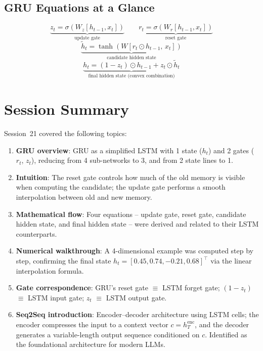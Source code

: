 \documentclass[12pt,a4paper]{article}
\begin{document}
\subsection{GRU Equations at a Glance}

\begin{equation}
  \underbrace{z_t = \sigma(W_z[h_{t-1}, x_t])}_{\text{update gate}}
  \qquad
  \underbrace{r_t = \sigma(W_r[h_{t-1}, x_t])}_{\text{reset gate}}
\end{equation}
\begin{equation}
  \underbrace{\tilde{h}_t = \tanh(W[r_t\odot h_{t-1},\, x_t])}_{\text{candidate hidden state}}
\end{equation}
\begin{equation}
  \underbrace{h_t = (1-z_t)\odot h_{t-1} + z_t\odot\tilde{h}_t}_{\text{final hidden state (convex combination)}}
\end{equation}

\section{Session Summary}
\label{sec:summary}

Session~21 covered the following topics:

\begin{enumerate}[label=\S\arabic*.]
  \item \textbf{GRU overview}: GRU as a simplified LSTM with 1 state ($h_t$) and 2 gates
        ($r_t$, $z_t$), reducing from 4 sub-networks to 3, and from 2 state lines to 1.

  \item \textbf{Intuition}: The reset gate controls how much of the old memory is visible when
        computing the candidate; the update gate performs a smooth interpolation between old
        and new memory.

  \item \textbf{Mathematical flow}: Four equations -- update gate, reset gate, candidate hidden
        state, and final hidden state -- were derived and related to their LSTM counterparts.

  \item \textbf{Numerical walkthrough}: A 4-dimensional example was computed step by step,
        confirming the final state $h_t = [0.45, 0.74, -0.21, 0.68]^\top$ via the linear
        interpolation formula.

  \item \textbf{Gate correspondence}: GRU's reset gate $\equiv$ LSTM forget gate;
        $(1-z_t)$ $\equiv$ LSTM input gate; $z_t$ $\equiv$ LSTM output gate.

  \item \textbf{Seq2Seq introduction}: Encoder--decoder architecture using LSTM cells;
        the encoder compresses the input to a context vector $c = h_T^{\text{enc}}$, and the
        decoder generates a variable-length output sequence conditioned on $c$. Identified as
        the foundational architecture for modern LLMs.
\end{enumerate}
\end{document}
